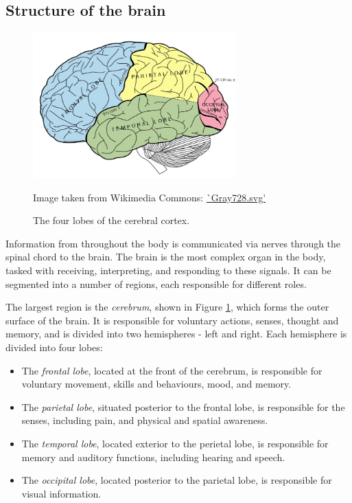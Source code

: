 \subsection*{Structure of the brain}\label{svd-brain}

\begin{figure}[ht]
	\centering
	\includegraphics[width=0.7\textwidth]{Images/2_Lobes_of_the_brain_NL.png}
	\caption{The four lobes of the cerebral cortex.}
	\small Image taken from Wikimedia Commons: \url{`Gray728.svg'}
	\label{svd-cerebrumfig}
\end{figure}

Information from throughout the body is communicated via nerves through the spinal chord to the brain. The brain is the most complex organ in the body, tasked with receiving, interpreting, and responding to these signals. It can be segmented into a number of regions, each responsible for different roles.

The largest region is the \textit{cerebrum}, shown in Figure \ref{svd-cerebrumfig}, which forms the outer surface of the brain. It is responsible for voluntary actions, senses, thought and memory, and is divided into two hemispheres - left and right. Each hemisphere is divided into four lobes:
 \begin{itemize}
	\item The \textit{frontal lobe}, located at the front of the cerebrum, is responsible for voluntary movement, skills and behaviours, mood, and memory.
	\item The \textit{parietal lobe}, situated posterior to the frontal lobe, is responsible for the senses, including pain, and physical and spatial awareness.
	\item The \textit{temporal lobe}, located exterior to the perietal lobe, is responsible for memory and auditory functions, including hearing and speech.
	\item The \textit{occipital lobe}, located posterior to the parietal lobe, is responsible for visual information.
\end{itemize}

